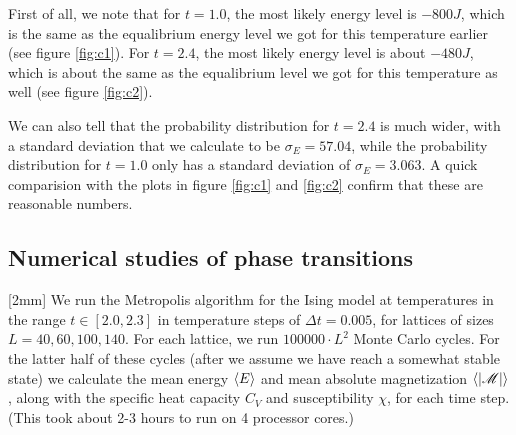 \documentclass[12pt,a4paper]{article}
\newcommand\M[1]{\begin{bmatrix} #1 \end{bmatrix}} %
\def\M{\mathscr{M}}
\newcommand\oppg[1]{\reversemarginnote{\textcolor{black!40}{#1)}}[2mm]}
\begin{document}
First of all, we note that for $t = 1.0$, the most likely energy level is $-800J$, which is the same as the equalibrium energy level we got for this temperature earlier (see figure \ref{fig:c1}). For $t = 2.4$, the most likely energy level is about $-480J$, which is about the same as the equalibrium level we got for this temperature as well (see figure \ref{fig:c2}).

We can also tell that the probability distribution for $t = 2.4$ is much wider, with a standard deviation that we calculate to be $\sigma_E = 57.04$, while the probability distribution for $t = 1.0$ only has a standard deviation of $\sigma_E = 3.063$. A quick comparision with the plots in figure \ref{fig:c1} and \ref{fig:c2} confirm that these are reasonable numbers.

\begin{figure}[!ht]
  \centering

   \label{fig:d}
\end{figure}

\subsection{Numerical studies of phase transitions}
\oppg{e}
We run the Metropolis algorithm for the Ising model at temperatures in the range $t \in [2.0,2.3]$ in temperature steps of $\Delta{t} = 0.005$, for lattices of sizes $L = 40, 60, 100, 140$. For each lattice, we run $\num{100000} \cdot L^2$ Monte Carlo cycles. For the latter half of these cycles (after we assume we have reach a somewhat stable state) we calculate the mean energy $\expval{E}$ and mean absolute magnetization $\expval{|\M|}$, along with the specific heat capacity $C_V$ and susceptibility $\chi$, for each time step. (This took about 2-3 hours to run on 4 processor cores.)
\end{document}
